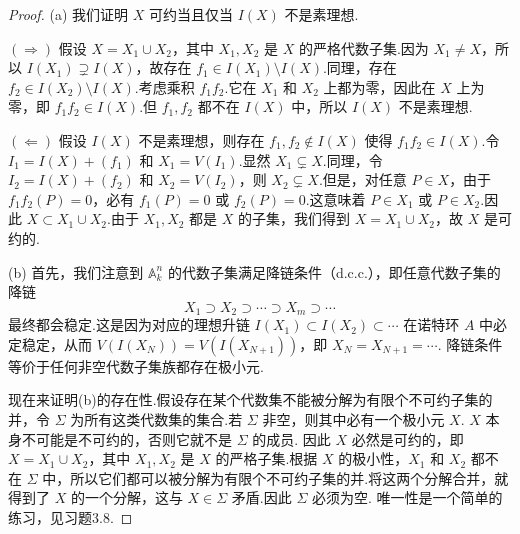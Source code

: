 \begin{proof}
(a) 我们证明 \(X\) 可约当且仅当 \(I(X)\) 不是素理想.

\(\left(  \Rightarrow  \right)\) 假设 \(X = {X}_{1} \cup  {X}_{2}\)，其中 \({X}_{1},{X}_{2}\) 是 \(X\) 的严格代数子集.因为 \({X}_{1} \neq X\)，所以 \(I(X_1) \supsetneq I(X)\)，故存在 \({f}_{1} \in  I\left( {X}_{1}\right)  \setminus  I\left( X\right)\).同理，存在 \({f}_{2} \in  I\left( {X}_{2}\right)  \setminus  I\left( X\right)\).考虑乘积 \({f}_{1}{f}_{2}\).它在 \(X_1\) 和 \(X_2\) 上都为零，因此在 \(X\) 上为零，即 \({f}_{1}{f}_{2} \in  I\left( X\right)\).但 \({f}_{1}, {f}_{2}\) 都不在 \(I(X)\) 中，所以 \(I\left( X\right)\) 不是素理想.

\(\left(  \Leftarrow  \right)\) 假设 \(I\left( X\right)\) 不是素理想，则存在 \({f}_{1},{f}_{2} \notin  I\left( X\right)\) 使得 \({f}_{1}{f}_{2} \in  I\left( X\right)\).令 \({I}_{1} = I\left( X\right) + ({f}_{1})\) 和 \({X}_{1} = V\left( {I}_{1}\right)\).显然 \({X}_{1} \subsetneq  X\).同理，令 \({I}_{2} = I\left( X\right) + ({f}_{2})\) 和 \({X}_{2} = V\left( {I}_{2}\right)\)，则 \({X}_{2} \subsetneq  X\).但是，对任意 \(P \in  X\)，由于 \({f}_{1}{f}_{2}\left( P\right)  = 0\)，必有 \({f}_{1}\left( P\right)  = 0\) 或 \({f}_{2}\left( P\right)  = 0\).这意味着 \(P \in X_1\) 或 \(P \in X_2\).因此 \(X \subset  {X}_{1} \cup  {X}_{2}\).由于 \(X_1, X_2\) 都是 \(X\) 的子集，我们得到 \(X = X_1 \cup X_2\)，故 \(X\) 是可约的.

(b) 首先，我们注意到 \({\mathbb{A}}_{k}^{n}\) 的代数子集满足降链条件（d.c.c.），即任意代数子集的降链
\[
{X}_{1} \supset  {X}_{2} \supset  \cdots  \supset  {X}_{m} \supset  \cdots
\]
最终都会稳定.这是因为对应的理想升链 \(I\left( {X}_{1}\right)  \subset  I\left( {X}_{2}\right)  \subset  \cdots\) 在诺特环 \(A\) 中必定稳定，从而 \(V(I(X_N)) = V(I(X_{N+1}))\)，即 \({X}_{N} = {X}_{N + 1} = \cdots\).
降链条件等价于任何非空代数子集族都存在极小元.

现在来证明(b)的存在性.假设存在某个代数集不能被分解为有限个不可约子集的并，令 \(\Sigma\) 为所有这类代数集的集合.若 \(\Sigma\) 非空，则其中必有一个极小元 \(X\).
\(X\) 本身不可能是不可约的，否则它就不是 \(\Sigma\) 的成员.
因此 \(X\) 必然是可约的，即 \(X = {X}_{1} \cup  {X}_{2}\)，其中 \({X}_{1},{X}_{2}\) 是 \(X\) 的严格子集.根据 \(X\) 的极小性，\({X}_{1}\) 和 \({X}_{2}\) 都不在 \(\Sigma\) 中，所以它们都可以被分解为有限个不可约子集的并.将这两个分解合并，就得到了 \(X\) 的一个分解，这与 \(X \in \Sigma\) 矛盾.因此 \(\Sigma\) 必须为空.
唯一性是一个简单的练习，见习题3.8.
\end{proof}

